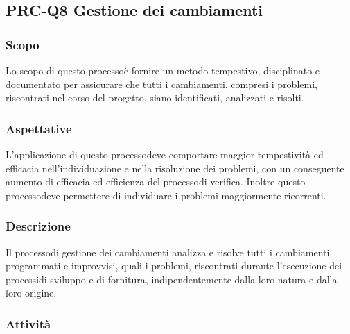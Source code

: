 \subsection{PRC-Q8 Gestione dei cambiamenti}
\subsubsection{Scopo}
Lo scopo di questo processo\glosp è fornire un metodo tempestivo, disciplinato e documentato per assicurare che tutti i cambiamenti, compresi i problemi, riscontrati nel corso del progetto\glo, siano identificati, analizzati e risolti.
\subsubsection{Aspettative}
L'applicazione di questo processo\glosp deve comportare maggior tempestività ed efficacia nell'individuazione e nella risoluzione dei problemi, con un conseguente aumento di efficacia ed efficienza del processo\glosp di verifica. Inoltre questo processo\glosp deve permettere di individuare i problemi maggiormente ricorrenti.
\subsubsection{Descrizione} 
Il processo\glosp di gestione dei cambiamenti analizza e risolve tutti i cambiamenti programmati e improvvisi, quali i problemi, riscontrati durante l'esecuzione dei processi\glosp di sviluppo e di fornitura, indipendentemente dalla loro natura e dalla loro origine. 
\subsubsection{Attività}
